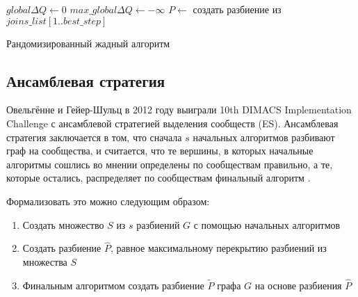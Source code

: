 \documentclass{matmex-diploma}
\begin{document}
\begin{algorithm}[p]
\SetAlgoLined
{}
\BlankLine
{}
$global\Delta Q \leftarrow 0$\;
$max\_global\Delta Q \leftarrow -\infty$\;
\BlankLine
{}
\BlankLine
$P \leftarrow $ создать разбиение из $joins\_list[1..best\_step]$\;
\BlankLine
\caption{Рандомизированный жадный алгоритм}
\label{alg:RG}
\end{algorithm}

\subsection{Ансамблевая стратегия}
Овельгённе и Гейер-Шульц в 2012 году выиграли 10th DIMACS Implementation Challenge с ансамблевой стратегией выделения сообществ (ES). Ансамблевая стратегия заключается в том, что сначала $s$ начальных алгоритмов разбивают граф на сообщества, и считается, что те вершины, в которых начальные алгоритмы сошлись во мнении определены по сообществам правильно, а те, которые остались, распределяет по сообществам финальный алгоритм \cite{Ovelgoenne&Geyer-Schulz:2012b}.

Формализовать это можно следующим образом:
\begin{enumerate}
	\item Создать множество $S$ из $s$ разбиений $G$ с помощью начальных алгоритмов
	\item Создать разбиение $\hat{P}$, равное максимальному перекрытию разбиений из множества $S$
	\item Финальным алгоритмом создать разбиение $\widetilde{P}$ графа $G$ на основе разбиения $\hat{P}$
\end{enumerate}
\end{document}

